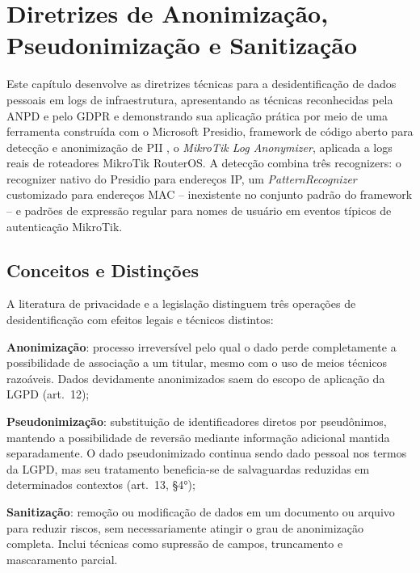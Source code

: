 
\chapter{Diretrizes de Anonimização, Pseudonimização e Sanitização}
\label{cap:anonimizacao}

Este capítulo desenvolve as diretrizes técnicas para a desidentificação de dados pessoais em logs de infraestrutura, apresentando as técnicas reconhecidas pela ANPD e pelo GDPR e demonstrando sua aplicação prática por meio de uma ferramenta construída com o Microsoft Presidio, framework de código aberto para detecção e anonimização de PII \cite{microsoft2023presidio}, o \textit{MikroTik Log Anonymizer}, aplicada a logs reais de roteadores MikroTik RouterOS. A detecção combina três recognizers: o recognizer nativo do Presidio para endereços IP, um \textit{PatternRecognizer} customizado para endereços MAC -- inexistente no conjunto padrão do framework -- e padrões de expressão regular para nomes de usuário em eventos típicos de autenticação MikroTik.

\section{Conceitos e Distinções}
\label{sec:conceitos-anon}

A literatura de privacidade e a legislação distinguem três operações de desidentificação com efeitos legais e técnicos distintos:

\begin{alineas}
    \item \textbf{Anonimização}: processo irreversível pelo qual o dado perde completamente a possibilidade de associação a um titular, mesmo com o uso de meios técnicos razoáveis. Dados devidamente anonimizados saem do escopo de aplicação da LGPD (art.\ 12);
    \item \textbf{Pseudonimização}: substituição de identificadores diretos por pseudônimos, mantendo a possibilidade de reversão mediante informação adicional mantida separadamente. O dado pseudonimizado continua sendo dado pessoal nos termos da LGPD, mas seu tratamento beneficia-se de salvaguardas reduzidas em determinados contextos (art.\ 13, §4°);
    \item \textbf{Sanitização}: remoção ou modificação de dados em um documento ou arquivo para reduzir riscos, sem necessariamente atingir o grau de anonimização completa. Inclui técnicas como supressão de campos, truncamento e mascaramento parcial.
\end{alineas}

